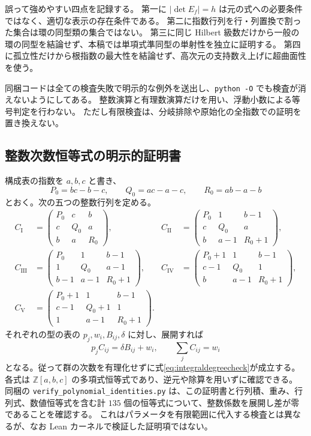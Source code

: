 \documentclass[11pt,a4paper]{ltjsarticle}
\numberwithin{equation}{section}
\theoremstyle{definition}
\newcommand{\Z}{\mathbb Z}\newcommand{\N}{\mathbb N}\newcommand{\Q}{\mathbb Q}\newcommand{\C}{\mathbb C}
\begin{document}
誤って強めやすい四点を記録する。
第一に $|\det E_f|=h$ は元の式への必要条件ではなく、適切な表示の存在条件である。
第二に指数行列を行・列置換で割った集合は環の同型類の集合ではない。
第三に同じ Hilbert 級数だけから一般の環の同型を結論せず、本稿では単項式準同型の単射性を独立に証明する。
第四に孤立性だけから根指数の最大性を結論せず、高次元の支持数え上げに超曲面性を使う。

同梱コードは全ての検査失敗で明示的な例外を送出し、\texttt{python -O} でも検査が消えないようにしてある。
整数演算と有理数演算だけを用い、浮動小数による等号判定を行わない。
ただし有限検査は、分岐排除や原始化の全指数での証明を置き換えない。

\newpage
\subsection{整数次数恒等式の明示的証明書}\label{app:certificates}
構成表の指数を $a,b,c$ と書き、
\[
 P_0=bc-b-c,\qquad Q_0=ac-a-c,\qquad R_0=ab-a-b
\]
とおく。次の五つの整数行列を定める。
\begin{align*}
 C_{\mathrm I}&=\begin{pmatrix}P_0&c&b\\c&Q_0&a\\b&a&R_0\end{pmatrix},&
 C_{\mathrm {II}}&=\begin{pmatrix}P_0&1&b-1\\c&Q_0&a\\b&a-1&R_0+1\end{pmatrix},\\[5pt]
 C_{\mathrm {III}}&=\begin{pmatrix}P_0&1&b-1\\1&Q_0&a-1\\b-1&a-1&R_0+1\end{pmatrix},&
 C_{\mathrm {IV}}&=\begin{pmatrix}P_0+1&1&b-1\\c-1&Q_0&1\\b&a-1&R_0+1\end{pmatrix},\\[5pt]
 C_{\mathrm V}&=\begin{pmatrix}P_0+1&1&b-1\\c-1&Q_0+1&1\\1&a-1&R_0+1\end{pmatrix}.&&
\end{align*}
それぞれの型の表の $p_j,w_i,B_{ij},\delta$ に対し、展開すれば
\[
 p_jC_{ij}=\delta B_{ij}+w_i,\qquad \sum_jC_{ij}=w_i
\]
となる。従って群の次数を有理化せずに式\eqref{eq:integraldegreecheck}が成立する。
各式は $\Z[a,b,c]$ の多項式恒等式であり、逆元や除算を用いずに確認できる。
同梱の \texttt{verify\_polynomial\_identities.py} は、この証明書と行列積、重み、行列式、数値恒等式を含む計 $135$ 個の恒等式について、整数係数を展開し差が零であることを確認する。
これはパラメータを有限範囲に代入する検査とは異なるが、なお Lean カーネルで検証した証明項ではない。
\end{document}
